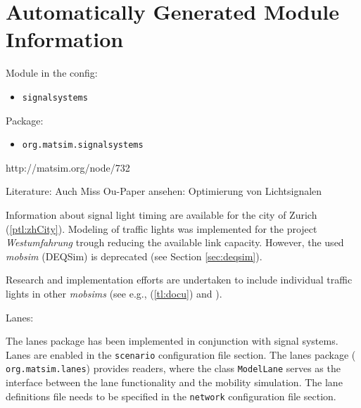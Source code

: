 \section{Automatically Generated Module Information}
Module in the config: 
\begin{itemize}
	\item \lstinline|signalsystems|
\end{itemize}

Package:
\begin{itemize}
	\item \lstinline|org.matsim.signalsystems|
\end{itemize}

http://matsim.org/node/732

Literature: \citet[][]{GretherEtAl_ABMTRANS_2012, Grether_PhDThesis_2014, Neumann_MastersThesis_2008}
Auch Miss Ou-Paper ansehen: Optimierung von Lichtsignalen

\citet[][p.?]{BalmerEtAl_ResRep_bdktzrh_2009}


Information about signal light timing are available for the city of Zurich  \citep{STAPOZH-DAV_unpub_gtZH_2008} (\ref{ptl:zhCity}). Modeling of traffic lights was implemented for the project \emph{Westumfahrung} trough reducing the available link capacity. However, the used \emph{mobsim} (DEQSim) is deprecated (see Section \ref{sec:deqsim}).

Research and implementation efforts are undertaken to include individual traffic lights in other \emph{mobsims} (see e.g., (\ref{tl:docu}) and \citet[][]{Neumann_MastersThesis_2008}).


Lanes:

The lanes package has been implemented in conjunction with signal systems. Lanes are enabled in the \lstinline|scenario| configuration file section. The lanes package (\lstinline| org.matsim.lanes|) provides readers, where the class \lstinline|ModelLane| serves as the interface between the lane functionality and the mobility simulation. The lane definitions file needs to be specified in the \lstinline|network| configuration file section.

